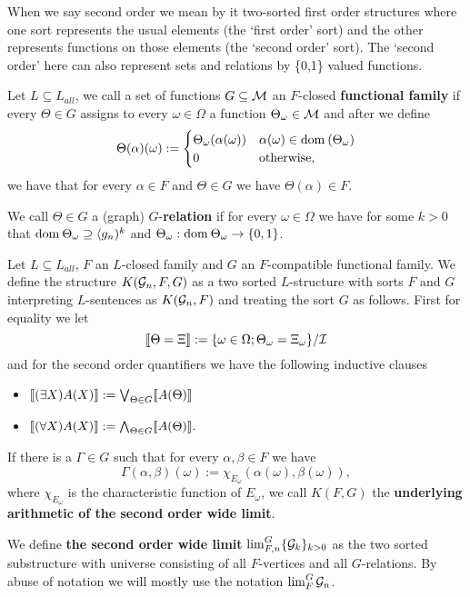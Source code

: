 When we say second order we mean by it two-sorted first order structures where one sort represents the usual elements (the `first order' sort) and the other represents functions on those elements (the `second order' sort). The `second order' here can also represent sets and relations by \{0,1\} valued functions.

\begin{defi}
Let $L\subseteq L_{all}$, we call a set of functions $G\subseteq \mathcal{M}$ an $F$-closed \textbf{functional family} if every $\Theta\in G$ assigns to every $\omega\in\Omega$ a function $\Theta_\omega\in\mathcal{M}$ and after we define
\[\Theta(\alpha)(\omega):=
\begin{cases}\Theta_\omega(\alpha(\omega))&\alpha(\omega)\in\text{dom}\:(\Theta_\omega)\\0&\text{otherwise,}
\end{cases}\]
we have that for every $\alpha \in F$ and $\Theta \in G$ we have $\Theta(\alpha)\in F$.

We call $\Theta\in G$ a (graph) $G$-\textbf{relation} if for every $\omega\in\Omega$ we have for some $k>0$ that $\text{dom}\: \Theta_\omega \supseteq \langle g_n)^k$ and $\Theta_\omega:\text{dom}\: \Theta_\omega \to \{0,1\}$.
\end{defi}

\begin{defi}
Let $L\subseteq L_{all}$, $F$ an $L$-closed family and $G$ an $F$-compatible functional family. We define the structure $K(\mathcal{G}_n,F,G)$ as a two sorted $L$-structure with sorts $F$ and $G$ interpreting $L$-sentences as $K(\mathcal{G}_n,F)$ and treating the sort $G$ as follows. First for equality we let
\[\llbracket\Theta=\Xi \rrbracket := \{\omega\in \Omega;\Theta_\omega=\Xi_\omega\}/\mathcal{I}\]
and for the second order quantifiers we have the following inductive clauses
\begin{itemize}
\item $\llbracket(\exists X)A(X)\rrbracket:=\bigvee_{\Theta\in G}\llbracket A(\Theta)\rrbracket$
\item $\llbracket(\forall X)A(X)\rrbracket:=\bigwedge_{\Theta\in G}\llbracket A(\Theta)\rrbracket.$
\end{itemize}

If there is a $\Gamma\in G$ such that for every $\alpha,\beta\in F$ we have
\[\Gamma(\alpha,\beta)(\omega):=\chi_{E_\omega}(\alpha(\omega),\beta(\omega)),\]
where $\chi_{E_\omega}$ is the characteristic function of $E_\omega$, we call $K(F,G)$ the \textbf{underlying arithmetic of the second order wide limit}.

We define \textbf{the second order wide limit} $\lim_{F,n}^G\{\mathcal{G}_k\}_{k>0}$ as the two sorted substructure with universe consisting of all $F$-vertices and all $G$-relations. By abuse of notation we will mostly use the notation $\lim_F^G\mathcal{G}_n$.
\end{defi}

